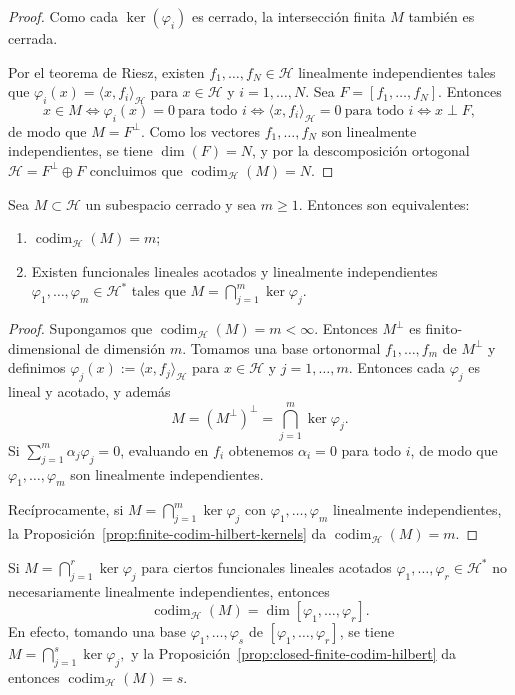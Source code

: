 \begin{proof}
	Como cada $\ker(\varphi_i)$ es cerrado, la intersección finita $M$ también es cerrada.

	Por el teorema de Riesz, existen $f_1,\dots,f_N\in\mathcal H$ linealmente independientes tales que \(\varphi_i(x)=\langle x,f_i\rangle_{\mathcal H}\) para $x\in\mathcal H$ y $i=1,\dots,N$. Sea \(F=[f_1, \dots, f_N]\).
	Entonces
	\[
		x\in M
		\iff \varphi_i(x)=0\ \text{para todo }i
		\iff \langle x,f_i\rangle_{\mathcal H}=0\ \text{para todo }i
		\iff x\perp F,
	\]
	de modo que $M=F^{\perp}$. Como los vectores $f_1,\dots,f_N$ son linealmente independientes, se tiene $\dim(F)=N$, y por la descomposición ortogonal $\mathcal H=F^{\perp}\oplus F$ concluimos que \(\operatorname{codim}_{\mathcal{H}}(M)=N\).
\end{proof}

\begin{prop}\label{prop:closed-finite-codim-hilbert}
	Sea $M\subset\mathcal H$ un subespacio cerrado y sea $m\geq 1$. Entonces son equivalentes:
	\begin{enumerate}
		\item $\operatorname{codim}_{\mathcal H}(M)=m$;
		\item Existen funcionales lineales acotados y linealmente independientes $\varphi_1,\dots,\varphi_m\in\mathcal H^*$ tales que $M=\bigcap_{j=1}^m \ker \varphi_j$.
	\end{enumerate}
\end{prop}

\begin{proof}
	Supongamos que $\operatorname{codim}_{\mathcal H}(M)=m<\infty$. Entonces $M^\perp$ es finito-dimensional de dimensión $m$. Tomamos una base ortonormal $f_1,\dots,f_m$ de $M^\perp$ y definimos \(\varphi_j(x):=\langle x,f_j\rangle_{\mathcal H}\) para $x\in\mathcal H$ y $j=1,\dots,m$. Entonces cada $\varphi_j$ es lineal y acotado, y además \[M=(M^\perp)^\perp=\bigcap_{j=1}^m \ker\varphi_j.\]
	Si $\sum_{j=1}^m\alpha_j\varphi_j=0$, evaluando en $f_i$ obtenemos $\alpha_i=0$ para todo $i$, de modo que $\varphi_1,\dots,\varphi_m$ son linealmente independientes.

	Recíprocamente, si $M=\bigcap_{j=1}^m\ker\varphi_j$ con $\varphi_1,\dots,\varphi_m$ linealmente independientes, la Proposición~\ref{prop:finite-codim-hilbert-kernels} da \(\operatorname{codim}_{\mathcal H}(M)=m\).
\end{proof}

\begin{rmk}
	Si $M=\bigcap_{j=1}^r\ker\varphi_j$ para ciertos funcionales lineales acotados $\varphi_1,\dots,\varphi_r\in\mathcal H^*$ no necesariamente linealmente independientes, entonces
	\[
		\operatorname{codim}_{\mathcal H}(M)=\dim[\varphi_1,\dots,\varphi_r].
	\]
	En efecto, tomando una base $\varphi_1,\dots,\varphi_s$ de $[\varphi_1,\dots,\varphi_r]$, se tiene
	\(
	M=\bigcap_{j=1}^s\ker\varphi_j,
	\)
	y la Proposición~\ref{prop:closed-finite-codim-hilbert} da entonces $\operatorname{codim}_{\mathcal H}(M)=s$.
\end{rmk}

